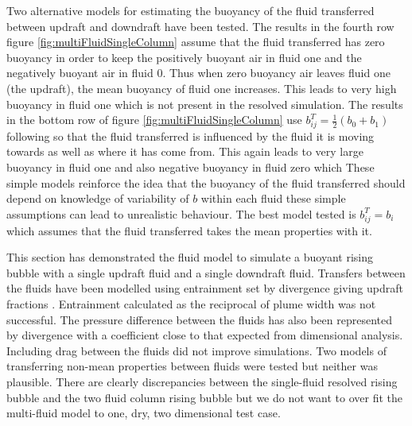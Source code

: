 \documentclass[draft]{agujournal2019}
\begin{document}
Two alternative models for estimating the buoyancy of the fluid transferred
between updraft and downdraft have been tested. The results in
the fourth row  figure \ref{fig:multiFluidSingleColumn} assume
that the fluid transferred has zero buoyancy in order to keep the
positively buoyant air in fluid one and the negatively buoyant air
in fluid 0. Thus when zero buoyancy air leaves fluid one (the updraft),
the mean buoyancy of fluid one increases. This leads to very high
buoyancy in fluid one which is not present in the resolved simulation.
The results in the bottom row of figure \ref{fig:multiFluidSingleColumn}
use $b_{ij}^{T}=\frac{1}{2}\left(b_{0}+b_{1}\right)$ following 
so that the fluid transferred is influenced by the fluid it is moving
towards as well as where it has come from. This again leads to very
large buoyancy in fluid one and also negative buoyancy in fluid zero
which  These simple models reinforce
the idea that the buoyancy of the fluid transferred should depend
on knowledge of  variability of $b$ within each fluid
\textendash{} these simple assumptions can lead to unrealistic behaviour.
The best model tested is $b_{ij}^{T}=b_{i}$ which assumes that the
fluid transferred takes the mean properties with it. 

This section has demonstrated the  fluid model to simulate a  buoyant rising bubble with a single
updraft fluid and a single downdraft fluid. Transfers between
the fluids have been  modelled using entrainment set by divergence giving  updraft fractions . Entrainment calculated
as the reciprocal of plume width was not successful. The pressure
difference between the fluids has also been represented by divergence
with a coefficient close to that expected from dimensional analysis.
Including drag between the fluids did not improve simulations. Two
models of transferring non-mean properties between fluids were tested
but neither was plausible. There are clearly discrepancies between
the single-fluid resolved rising bubble and the two fluid  column
rising bubble but we do not want to over fit the multi-fluid model
to one, dry, two dimensional test case.
\end{document}

